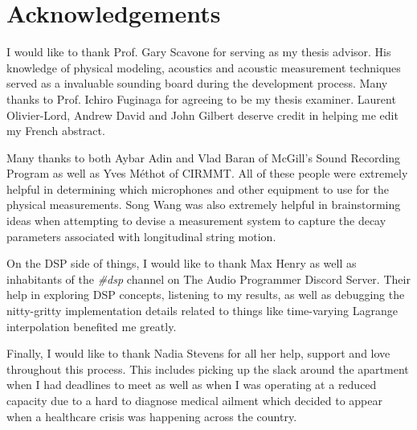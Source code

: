 \documentclass[../main.tex]{subfiles}
\begin{document}
\chapter*{Acknowledgements}
I would like to thank Prof. Gary Scavone for serving as my thesis advisor. His knowledge of physical modeling, acoustics and acoustic measurement techniques served as a invaluable sounding board during the development process. Many thanks to Prof. Ichiro Fuginaga for agreeing to be my thesis examiner. Laurent Olivier-Lord, Andrew David and John Gilbert deserve credit in helping me edit my French abstract.

Many thanks to both Aybar Adin and Vlad Baran of McGill's Sound Recording Program as well as Yves Méthot of CIRMMT. All of these people were extremely helpful in determining which microphones and other equipment to use for the physical measurements. Song Wang was also extremely helpful in brainstorming ideas when attempting to devise a measurement system to capture the decay parameters associated with longitudinal string motion.

On the DSP side of things, I would like to thank Max Henry as well as inhabitants of the \emph{\#dsp} channel on The Audio Programmer Discord Server. Their help in exploring DSP concepts, listening to my results, as well as debugging the nitty-gritty implementation details related to things like time-varying Lagrange interpolation benefited me greatly.

Finally, I would like to thank Nadia Stevens for all her help, support and love throughout this process. This includes picking up the slack around the apartment when I had deadlines to meet as well as when I was operating at a reduced capacity due to a hard to diagnose medical ailment which decided to appear when a healthcare crisis was happening across the country.
\end{document}
